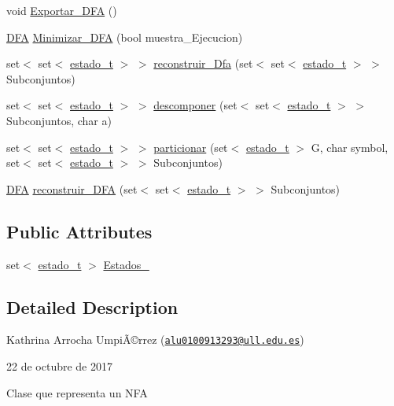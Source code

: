 \begin{DoxyCompactItemize}
void \hyperlink{classDFA_abcfd9884cece764167a8c3c8fa083497}{Exportar\-\_\-\-D\-F\-A} ()
\item 
\hyperlink{classDFA}{D\-F\-A} \hyperlink{classDFA_a9dc081c267475f9d5099dfff03ced6a2}{Minimizar\-\_\-\-D\-F\-A} (bool muestra\-\_\-\-Ejecucion)
\item 
set$<$ set$<$ \hyperlink{classestado__t}{estado\-\_\-t} $>$ $>$ \hyperlink{classDFA_ac38ab36866af60c6948dfb20f713b9d6}{reconstruir\-\_\-\-Dfa} (set$<$ set$<$ \hyperlink{classestado__t}{estado\-\_\-t} $>$ $>$ Subconjuntos)
\item 
set$<$ set$<$ \hyperlink{classestado__t}{estado\-\_\-t} $>$ $>$ \hyperlink{classDFA_a3c6637fde6efa43f75399b6407636cda}{descomponer} (set$<$ set$<$ \hyperlink{classestado__t}{estado\-\_\-t} $>$ $>$ Subconjuntos, char a)
\item 
set$<$ set$<$ \hyperlink{classestado__t}{estado\-\_\-t} $>$ $>$ \hyperlink{classDFA_a228e7a01035c7ea79794111a0644b1a3}{particionar} (set$<$ \hyperlink{classestado__t}{estado\-\_\-t} $>$ G, char symbol, set$<$ set$<$ \hyperlink{classestado__t}{estado\-\_\-t} $>$ $>$ Subconjuntos)
\item 
\hyperlink{classDFA}{D\-F\-A} \hyperlink{classDFA_a0e0bb665a8738f1fd8d4062cd8301fcc}{reconstruir\-\_\-\-D\-F\-A} (set$<$ set$<$ \hyperlink{classestado__t}{estado\-\_\-t} $>$ $>$ Subconjuntos)
\end{DoxyCompactItemize}
\subsection*{Public Attributes}
\begin{DoxyCompactItemize}
\item 
set$<$ \hyperlink{classestado__t}{estado\-\_\-t} $>$ \hyperlink{classDFA_a6030e3446246552a16a7de723b08964e}{Estados\-\_\-}
\end{DoxyCompactItemize}


\subsection{Detailed Description}
Kathrina Arrocha UmpiÃ©rrez (\href{mailto:alu0100913293@ull.edu.es}{\tt alu0100913293@ull.\-edu.\-es})

22 de octubre de 2017

Clase que representa un N\-F\-A 

